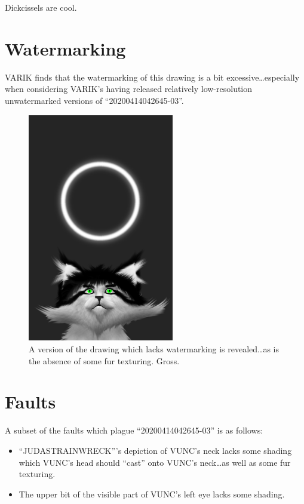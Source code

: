 \documentclass{report}
\begin{document}
Dickcissels are cool.
\section{Watermarking}
VARIK finds that the watermarking of this drawing is a bit excessive\ldots especially when considering VARIK's having released relatively low-resolution unwatermarked versions of ``20200414042645-03''.
\begin{figure}[ht]
	\centering
	\includegraphics[height=10cm]{20200414042645-03/20200414042645-03-uw.png}
	\caption[center]{A version of the drawing which lacks watermarking is revealed\ldots as is the absence of some fur texturing.  Gross.}
\end{figure}
\section{Faults}
A subset of the faults which plague ``20200414042645-03'' is as follows:
\begin{itemize}
	\item ``JUDASTRAINWRECK'''s depiction of VUNC's neck lacks some shading which VUNC's head should ``cast'' onto VUNC's neck\ldots as well as some fur texturing.
	\item The upper bit of the visible part of VUNC's left eye lacks some shading.
\end{itemize}
\end{document}
